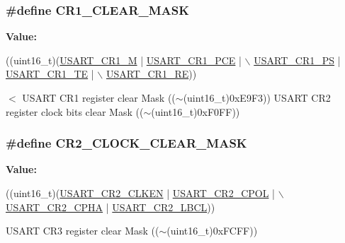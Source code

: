 \subsubsection[{\texorpdfstring{C\+R1\+\_\+\+C\+L\+E\+A\+R\+\_\+\+M\+A\+SK}{CR1_CLEAR_MASK}}]{\setlength{\rightskip}{0pt plus 5cm}\#define C\+R1\+\_\+\+C\+L\+E\+A\+R\+\_\+\+M\+A\+SK}\hypertarget{group___u_s_a_r_t_ga8d425258898b4af4ebc820f52635fad8}{}\label{group___u_s_a_r_t_ga8d425258898b4af4ebc820f52635fad8}
{\bfseries Value\+:}
\begin{DoxyCode}
((uint16\_t)(\hyperlink{group___peripheral___registers___bits___definition_ga95f0288b9c6aaeca7cb6550a2e6833e2}{USART\_CR1\_M} | \hyperlink{group___peripheral___registers___bits___definition_ga60f8fcf084f9a8514efafb617c70b074}{USART\_CR1\_PCE} | \(\backslash\)
                                              \hyperlink{group___peripheral___registers___bits___definition_ga2e159d36ab2c93a2c1942df60e9eebbe}{USART\_CR1\_PS} | 
      \hyperlink{group___peripheral___registers___bits___definition_gade7f090b04fd78b755b43357ecaa9622}{USART\_CR1\_TE} | \(\backslash\)
                                              \hyperlink{group___peripheral___registers___bits___definition_gada0d5d407a22264de847bc1b40a17aeb}{USART\_CR1\_RE}))
\end{DoxyCode}
$<$ U\+S\+A\+RT C\+R1 register clear Mask (($\sim$(uint16\+\_\+t)0x\+E9\+F3)) U\+S\+A\+RT C\+R2 register clock bits clear Mask (($\sim$(uint16\+\_\+t)0x\+F0\+FF)) 
\subsubsection[{\texorpdfstring{C\+R2\+\_\+\+C\+L\+O\+C\+K\+\_\+\+C\+L\+E\+A\+R\+\_\+\+M\+A\+SK}{CR2_CLOCK_CLEAR_MASK}}]{\setlength{\rightskip}{0pt plus 5cm}\#define C\+R2\+\_\+\+C\+L\+O\+C\+K\+\_\+\+C\+L\+E\+A\+R\+\_\+\+M\+A\+SK}\hypertarget{group___u_s_a_r_t_ga7834b3d9be4875de242f87c12fd79f02}{}\label{group___u_s_a_r_t_ga7834b3d9be4875de242f87c12fd79f02}
{\bfseries Value\+:}
\begin{DoxyCode}
((uint16\_t)(\hyperlink{group___peripheral___registers___bits___definition_ga42a396cde02ffa0c4d3fd9817b6af853}{USART\_CR2\_CLKEN} | \hyperlink{group___peripheral___registers___bits___definition_gafbb4336ac93d94d4e78f9fb7b3a0dc68}{USART\_CR2\_CPOL} | \(\backslash\)
                                              \hyperlink{group___peripheral___registers___bits___definition_ga362976ce813e58310399d113d2cf09cb}{USART\_CR2\_CPHA} | 
      \hyperlink{group___peripheral___registers___bits___definition_ga4a62e93ae7864e89622bdd92508b615e}{USART\_CR2\_LBCL}))
\end{DoxyCode}
U\+S\+A\+RT C\+R3 register clear Mask (($\sim$(uint16\+\_\+t)0x\+F\+C\+FF)) 
